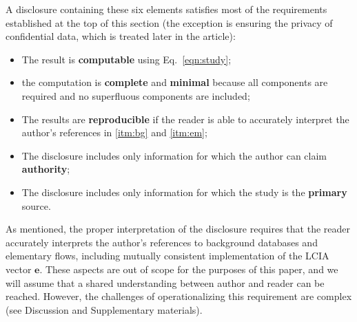 A disclosure containing these six elements satisfies most of the requirements established at the top of this section (the exception is ensuring the privacy of confidential data, which is treated later in the article):
\begin{itemize}
  \item The result is \textbf{computable} using Eq.~\ref{eqn:study};
  \item the computation is \textbf{complete} and \textbf{minimal} because all components are required and no superfluous components are included;
  \item The results are \textbf{reproducible} if the reader is able to accurately interpret the author's references in \ref{itm:bg} and \ref{itm:em};
  \item The disclosure includes only information for which the author can claim \textbf{authority};
  \item The disclosure includes only information for which the study is the \textbf{primary} source.  
\end{itemize}
As mentioned, the proper interpretation of the disclosure requires that the reader accurately interprets the author's references to background databases and elementary flows, including mutually consistent implementation of the LCIA vector $\mathbf{e}$.  These aspects are out of scope for the purposes of this paper, and we will assume that a shared understanding between author and reader can be reached.  However, the challenges of operationalizing this requirement are complex (see Discussion and Supplementary materials).  %


